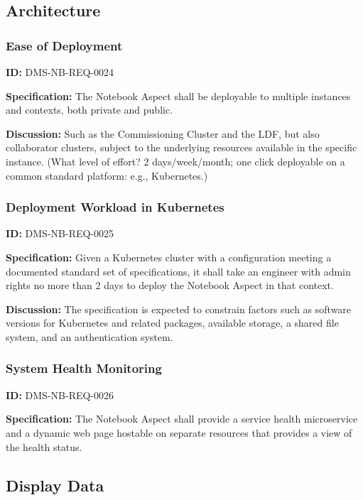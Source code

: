 \documentclass[SE,toc]{lsstdoc}
\begin{document}
\subsection{Architecture}

\subsubsection{Ease of Deployment}

\label{DMS-NB-REQ-0024}
\textbf{ID:} DMS-NB-REQ-0024

\textbf{Specification:}
The Notebook Aspect shall be deployable to multiple instances and contexts, both private and public.

\textbf{Discussion:}
Such as the Commissioning Cluster and the LDF, but also collaborator clusters, subject to the underlying resources available in the specific instance. (What level of effort? 2 days/week/month; one click deployable on a common standard platform: e.g., Kubernetes.)

\subsubsection{Deployment Workload in Kubernetes}

\label{DMS-NB-REQ-0025}
\textbf{ID:} DMS-NB-REQ-0025

\textbf{Specification:}
Given a Kubernetes cluster with a configuration meeting a documented standard set of specifications, it shall take an engineer with admin rights no more than 2 days to deploy the Notebook Aspect in that context.

\textbf{Discussion:}
The specification is expected to constrain factors such as software versions for Kubernetes and related packages, available storage, a shared file system, and an authentication system.

\subsubsection{System Health Monitoring}

\label{DMS-NB-REQ-0026}
\textbf{ID:} DMS-NB-REQ-0026

\textbf{Specification:}
The Notebook Aspect shall provide a service health microservice and a dynamic web page hostable on separate resources that provides a view of the health status.

\subsection{Display Data}
\end{document}
